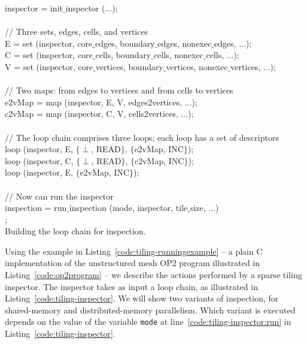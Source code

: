 \begin{algorithm}
\scriptsize\ttfamily
{}
inspector = init$\_$inspector (...);\\
~\\
// Three sets, edges, cells, and vertices\\
E = set (inspector, core$\_$edges, boundary$\_$edges, nonexec$\_$edges, ...);\\
C = set (inspector, core$\_$cells, boundary$\_$cells, nonexec$\_$cells, ...);\\
V = set (inspector, core$\_$vertices, boundary$\_$vertices, nonexec$\_$vertices, ...);\\ 
~\\
// Two maps: from edges to vertices and from cells to vertices\\
e2vMap = map (inspector, E, V, edges2vertices, ...);\\
c2vMap = map (inspector, C, V, cells2vertices, ...);\\
~\\
// The loop chain comprises three loops; each loop has a set of descriptors\\
loop (inspector, E, $\lbrace \perp$, READ$\rbrace$, $\lbrace$e2vMap, INC$\rbrace$);\\
loop (inspector, C, $\lbrace \perp$, READ$\rbrace$, $\lbrace$c2vMap, INC$\rbrace$);\\
loop (inspector, E, $\lbrace$e2vMap, INC$\rbrace$); \\
~\\
// Now can run the inspector\\
inspection = run$\_$inspection (mode, inspector, tile$\_$size, ...)\\ \label{code:tiling-inspector:run}
;\\
\caption{Building the loop chain for inspection.}
\label{code:tiling-inspector}
\end{algorithm}

Using the example in Listing~\ref{code:tiling-runningexample} -- a plain C implementation of the unstructured mesh OP2 program illustrated in Listing~\ref{code:op2program} -- we describe the actions performed by a sparse tiling inspector. The inspector takes as input a loop chain, as illustrated in Listing~\ref{code:tiling-inspector}. We will show two variants of inspection, for shared-memory and distributed-memory parallelism. Which variant is executed depends on the value of the variable \texttt{mode} at line~\ref{code:tiling-inspector:run} in Listing~\ref{code:tiling-inspector}.

